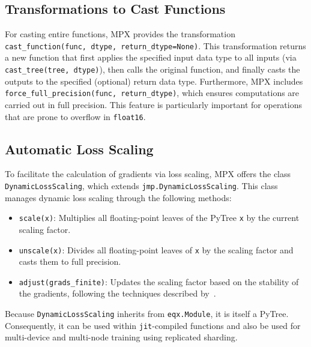 \documentclass[logo]{dsme}
\newcommand{\mpx}{\textsc{MPX}}
\begin{document}
\subsection{Transformations to Cast Functions}
\label{sec:castingfunctions}

For casting entire functions, \mpx{} provides the transformation \texttt{cast\_function(func, dtype, return\_dtype=None)}. 
This transformation returns a new function that first applies the specified input data type to all inputs (via \texttt{cast\_tree(tree, dtype)}), then calls the original function, and finally casts the outputs to the specified (optional) return data type. 
Furthermore, \mpx{} includes \texttt{force\_full\_precision(func, return\_dtype)}, which ensures computations are carried out in full precision. 
This feature is particularly important for operations that are prone to overflow in \texttt{float16}.


\subsection{Automatic Loss Scaling}
\label{sec:scaling}

To facilitate the calculation of gradients via loss scaling, \mpx{} offers the class \texttt{DynamicLossScaling}, which extends \texttt{jmp.DynamicLossScaling}. 
This class manages dynamic loss scaling through the following methods:

\begin{itemize}
    \item \texttt{scale(x)}: Multiplies all floating-point leaves of the PyTree \texttt{x} by the current scaling factor.
    \item \texttt{unscale(x)}: Divides all floating-point leaves of \texttt{x} by the scaling factor and casts them to full precision.
    \item \texttt{adjust(grads\_finite)}: Updates the scaling factor based on the stability of the gradients, following the techniques described by~\cite{mixed_precision_paper}.
\end{itemize}

Because \texttt{DynamicLossScaling} inherits from \texttt{eqx.Module}, it is itself a PyTree. 
Consequently, it can be used within \texttt{jit}-compiled functions and also be used for multi-device and multi-node training using replicated sharding.
\end{document}
